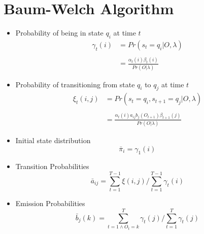 \section{Baum-Welch Algorithm}
\begin{frame}
\begin{itemize}
\item Probability of being in state $q_i$ at time $t$
\begin{align*}
  	\gamma_t(i) &= Pr(s_t = q_i \vert O, \lambda) \\ \\
		    &= \frac{\alpha_t(i)\beta_t(i)}{Pr(O \vert \lambda)} 
\end{align*}  

\item Probability of transitioning from state $q_i$ to $q_j$ at time $t$
\begin{align*}
	\xi_t(i,j) &= Pr(s_t = q_i, s_{t+1} = q_j \vert O, \lambda) \\ \\
                        &= \frac{\alpha_t(i)a_{ij}b_j(O_{t+1})\beta_{t+1}(j)}{Pr(O \vert \lambda)} 
\end{align*}
\end{itemize}
\end{frame}

\begin{frame}

\begin{itemize}
\item Initial state distribution 
$$ \bar{\pi}_i = \gamma_1(i)$$ 
\item Transition Probabilities 
$$ \bar{a}_{ij} = \sum_{t=1}^{T-1} \xi(i,j) / \sum_{t=1}^{T-1}\gamma_t(i)$$ 
\item Emission Probabilities 
$$ \bar{b}_j(k) = \sum_{t=1 \wedge O_t=k}^{T} \gamma_t(j) / \sum_{t=1}^{T} \gamma_t(j)$$
\end{itemize}




\end{frame}














